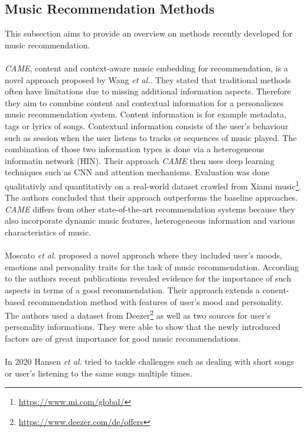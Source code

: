 \documentclass[runningheads,a4paper]{llncs}
\begin{document}
\subsection{Music Recommendation Methods} 
This subsection aims to provide an overview on methods recently developed for music recommendation.\\
\\
\textit{CAME}, content and context-aware music embedding for recommendation, is a novel approach proposed by Wang \textit{et al.}.
They stated that traditional methods often have limitations due to missing additional information aspects. 
Therefore they aim to comnbine content and contextual information for a personaliezes music recommendation system. 
Content information is for example metadata, tags or lyrics of songs. 
Contextual information consists of the user's behaviour such as session when the user listens to tracks or sequences of music played. 
The combination of those two information types is done via a heterogeneous informatin network (HIN).
Their approach \textit{CAME} then uses deep learning techniques such as CNN and attention mechanisms.
Evaluation was done qualitativly and quantitativly on a real-world dataset crawled from Xiami music\footnote{\url{https://www.mi.com/global/}}. 
The authors concluded that their approach outperforms the baseline approaches.
\textit{CAME} differs from other state-of-the-art recommendation systems because they 
also incorporate dynamic music features, heterogeneous information and various characteristics of music.
\cite{wang2020came}\\
\\
Moscato \textit{et al.} proposed a novel approach where they included user's moods, emotions and personality traits for the 
task of music recommendation. According to the authors recent publications revealed evidence for the importance of such aspects in terms of 
a good recommendation.
Their approach extends a conent-based recommendation method with features of user's mood and personality.\\
The authors used a dataset from Deezer\footnote{\url{https://www.deezer.com/de/offers}} as well as two sources for 
user's personality informations. 
They were able to show that the newly introduced factors are of great importance for good music recommendations. \cite{moscato2020emotional}\\
\\
In 2020 Hansen \textit{et al.} tried to tackle challenges such as dealing with short songs or user's listening to the same songs multiple times.
\end{document}
